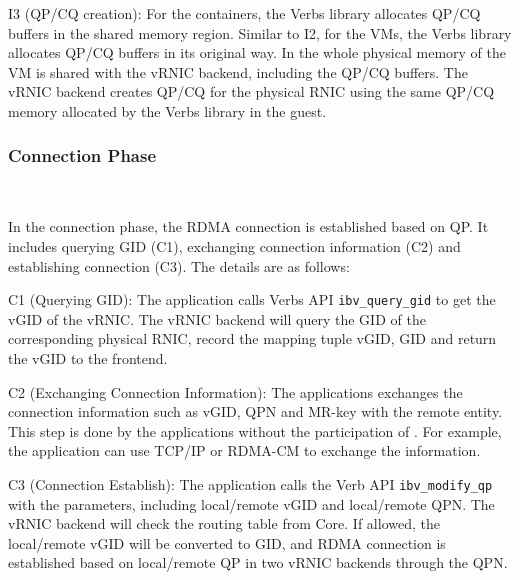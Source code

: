 
I3 (QP/CQ creation): For the containers, the Verbs library allocates QP/CQ buffers in the shared memory region. Similar to I2, for the VMs, the Verbs library allocates QP/CQ buffers in its original way. In \sys the whole physical memory of the VM is shared with the vRNIC backend, including the QP/CQ buffers. The vRNIC backend creates QP/CQ for the physical RNIC using the same QP/CQ memory allocated by the Verbs library in the guest.

\subsubsection{\textbf{Connection Phase}}
\
\noindent

In the connection phase, the RDMA connection is established based on QP. It includes querying GID (C1), exchanging connection information (C2) and establishing connection (C3). The details are as follows:

C1 (Querying GID): The application calls Verbs API \texttt{ibv\_query\_gid} to get the vGID of the vRNIC. The vRNIC backend will query the GID of the corresponding physical RNIC, record the mapping tuple {vGID, GID} and return the vGID to the frontend.

C2 (Exchanging Connection Information): The applications exchanges the connection information such as vGID, QPN and MR-key with the remote entity. This step is done by the applications without the participation of \sys. For example, the application can use TCP/IP or RDMA-CM to exchange the information.

C3 (Connection Establish): The application calls the Verb API \texttt{ibv\_modify\_qp} with the parameters, including local/remote vGID and local/remote QPN. The vRNIC backend will check the routing table from \sys Core. If allowed, the local/remote vGID will be converted to GID, and RDMA connection is established based on local/remote QP in two vRNIC backends through the QPN.


